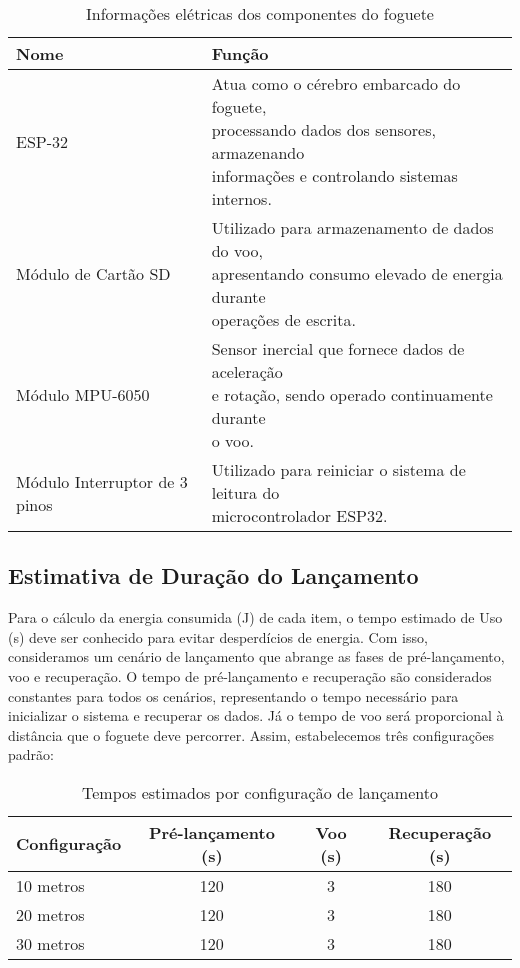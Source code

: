 \begin{table}[H]
    \centering
    \caption{Informações elétricas dos componentes do foguete}
    \label{tab:componentes_foguete}
    \begin{tabular}{|l|l|}
        \hline
        Nome & Função \\
        \hline
        ESP-32 & \makecell[l]{Atua como o cérebro embarcado do foguete, \\ processando dados dos sensores, armazenando \\ informações e controlando sistemas internos.} \\
		\hline
        Módulo de Cartão SD & \makecell[l]{Utilizado para armazenamento de dados do voo, \\ apresentando consumo elevado de energia durante \\ operações de escrita.} \\
		\hline
		Módulo MPU-6050 & \makecell[l]{Sensor inercial que fornece dados de aceleração \\ e rotação, sendo operado continuamente durante \\ o voo.} \\
		\hline
		Módulo Interruptor de 3 pinos & \makecell[l]{Utilizado para reiniciar o sistema de leitura do \\ microcontrolador ESP32.} \\
		\hline
    \end{tabular}
\end{table}

\subsection{Estimativa de Duração do Lançamento}

Para o cálculo da energia consumida (J) de cada item, o tempo estimado de Uso (s) deve ser conhecido para evitar desperdícios de energia. Com isso, consideramos um cenário de lançamento que abrange as fases de pré-lançamento, voo e recuperação. O tempo de pré-lançamento e recuperação são considerados constantes para todos os cenários, representando o tempo necessário para inicializar o sistema e recuperar os dados. Já o tempo de voo será proporcional à distância que o foguete deve percorrer. Assim, estabelecemos três configurações padrão: 
 
\begin{table}[H]
	\centering
	\caption{Tempos estimados por configuração de lançamento}
	\label{tab:duracao_lancamento}
	\begin{tabular}{|l|c|c|c|}
		\hline
		Configuração & Pré-lançamento (s) & Voo (s) & Recuperação (s) \\
		\hline
		10 metros & 120 & 3 & 180 \\
		\hline
		20 metros & 120 & 3 & 180 \\
		\hline
		30 metros & 120 & 3 & 180 \\
		\hline
	\end{tabular}
\end{table}

